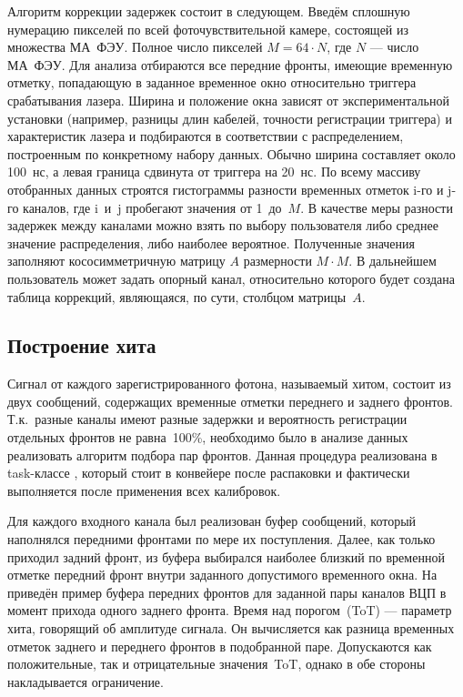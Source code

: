 Алгоритм коррекции задержек состоит в следующем. Введём сплошную нумерацию пикселей по всей фоточувствительной камере, состоящей из множества МА~ФЭУ. Полное число пикселей $ M = 64 \cdot N $, где $N$ --- число МА~ФЭУ. Для анализа отбираются все передние фронты, имеющие временную отметку, попадающую в заданное временное окно относительно триггера срабатывания лазера. Ширина и положение окна зависят от экспериментальной установки (например, разницы длин кабелей, точности регистрации триггера) и характеристик лазера и подбираются в соответствии с распределением, построенным по конкретному набору данных. Обычно ширина составляет около 100~нс, а левая граница сдвинута от триггера на 20~нс. По всему массиву отобранных данных строятся гистограммы разности временных отметок i-го и j-го каналов, где i~и~j пробегают значения от 1~до~$M$. В качестве меры разности задержек между каналами можно взять по выбору пользователя либо среднее значение распределения, либо наиболее вероятное. Полученные значения заполняют кососимметричную матрицу $A$ размерности $ M \cdot M $. В дальнейшем пользователь может задать опорный канал, относительно которого будет создана таблица коррекций, являющаяся, по сути, столбцом матрицы~$A$.

\subsection{Построение хита}\label{sec:secHitBuilding}

Сигнал от каждого зарегистрированного фотона, называемый хитом, состоит из двух сообщений, содержащих временные отметки переднего и заднего фронтов. Т.к.~разные каналы имеют разные задержки и вероятность регистрации отдельных фронтов не равна~100\%, необходимо было в анализе данных реализовать алгоритм подбора пар фронтов. Данная процедура реализована в task-классе , который стоит в конвейере после распаковки и фактически выполняется после применения всех калибровок.

Для каждого входного канала был реализован буфер сообщений, который наполнялся передними фронтами по мере их поступления. Далее, как только приходил задний фронт, из буфера выбирался наиболее близкий по временной отметке передний фронт внутри заданного допустимого временного окна. На  приведён пример буфера передних фронтов для заданной пары каналов ВЦП в момент прихода одного заднего фронта. Время над порогом~(ToT) --- параметр хита, говорящий об амплитуде сигнала. Он вычисляется как разница временных отметок заднего и переднего фронтов в подобранной паре. Допускаются как положительные, так и отрицательные значения~ToT, однако в обе стороны накладывается ограничение.

